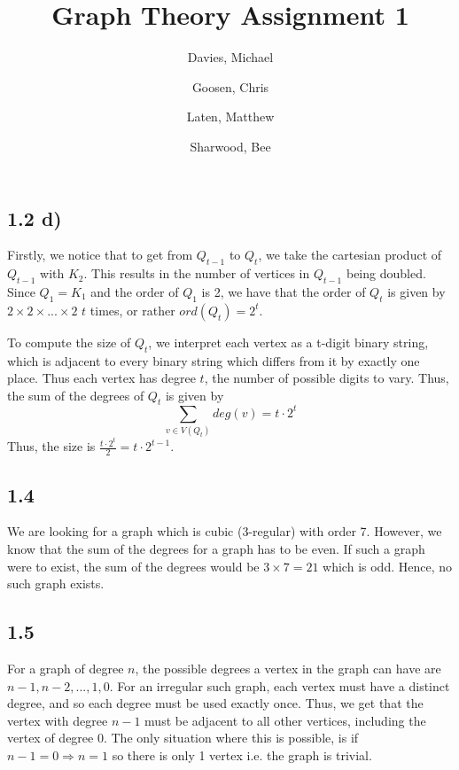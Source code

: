 \documentclass[a4paper]{article}
\begin{document}
\title{Graph Theory Assignment 1}
\author {
    Davies, Michael\\
    \and
    Goosen, Chris\\
    \and
    Laten, Matthew\\
    \and
    Sharwood, Bee\\
    \and
}
\maketitle

\subsection*{1.2 d)}
Firstly, we notice that to get from $Q_{t-1}$ to $Q_t$, we take the cartesian
product of $Q_{t-1}$ with $K_2$. This results in the number of vertices in
$Q_{t-1}$ being doubled. Since $Q_1 = K_1$ and the order of $Q_1$ is 2, we have
that the order of $Q_t$ is given by $2 \times 2 \times ... \times 2$ $t$ times,
or rather $ord(Q_t) = 2^t$.

To compute the size of $Q_t$, we interpret each vertex as a t-digit binary
string, which is adjacent to every binary string which differs from it by
exactly one place. Thus each vertex has degree $t$, the number of possible digits to vary.
Thus, the sum of the degrees of $Q_t$ is given by
\begin{equation}
    \sum_{v \in V(Q_t)} deg(v) = t\cdot2^t
\end{equation}
Thus, the size is $\frac{t\cdot2^t}{2} = t\cdot2^{t-1}$.

\subsection*{1.4}
We are looking for a graph which is cubic (3-regular) with order 7. However,
we know that the sum of the degrees for a graph has to be even. If such a graph
were to exist, the sum of the degrees would be $3 \times 7 = 21$ which is odd. 
Hence, no such graph exists.

\subsection*{1.5}
For a graph of degree $n$, the possible degrees a vertex in the graph can have
are $n-1, n-2, ..., 1, 0$. For an irregular such graph, each vertex must have
a distinct degree, and so each degree must be used exactly once. Thus, we get that
the vertex with degree $n-1$ must be adjacent to all other vertices, including
the vertex of degree $0$. The only situation where this is possible, is if
$n-1 = 0 \Rightarrow n = 1$ so there is only 1 vertex i.e. the graph is trivial.
\end{document}
